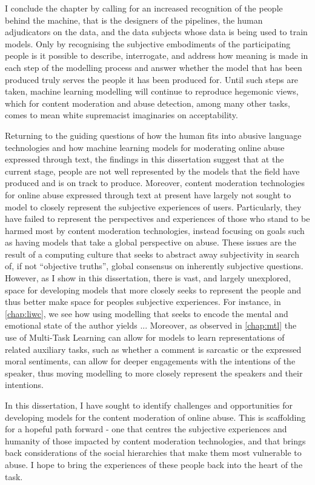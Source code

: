 I conclude the chapter by calling for an increased recognition of the people behind the machine, that is the designers of the pipelines, the human adjudicators on the data, and the data subjects whose data is being used to train models.
Only by recognising the subjective embodiments of the participating people is it possible to describe, interrogate, and address how meaning is made in each step of the modelling process and answer whether the model that has been produced truly serves the people it has been produced for.
Until such steps are taken, machine learning modelling will continue to reproduce hegemonic views, which for content moderation and abuse detection, among many other tasks, comes to mean white supremacist imaginaries on acceptability.


\vspace{5mm}
Returning to the guiding questions of how the human fits into abusive language technologies and how machine learning models for moderating online abuse expressed through text, the findings in this dissertation suggest that at the current stage, people are not well represented by the models that the field have produced and is on track to produce.
Moreover, content moderation technologies for online abuse expressed through text at present have largely not sought to model to closely represent the subjective experiences of users.
Particularly, they have failed to represent the perspectives and experiences of those who stand to be harmed most by content moderation technologies, instead focusing on goals such as having models that take a global perspective on abuse.
These issues are the result of a computing culture that seeks to abstract away subjectivity in search of, if not ``objective truths'', global consensus on inherently subjective questions.
However, as I show in this dissertation, there is vast, and largely unexplored, space for developing models that more closely seeks to represent the people and thus better make space for peoples subjective experiences.
For instance, in \cref{chap:liwc}, we see how using modelling that seeks to encode the mental and emotional state of the author yields ... %
Moreover, as observed in \cref{chap:mtl} the use of Multi-Task Learning can allow for models to learn representations of related auxiliary tasks, such as whether a comment is sarcastic or the expressed moral sentiments, can allow for deeper engagements with the intentions of the speaker, thus moving modelling to more closely represent the speakers and their intentions.

In this dissertation, I have sought to identify challenges and opportunities for developing models for the content moderation of online abuse. This is scaffolding for a hopeful path forward - one that centres the subjective experiences and humanity of those impacted by content moderation technologies,  and that brings back considerations of the social hierarchies that make them most vulnerable to abuse.
I hope to bring the experiences of these people back into the heart of the task.
